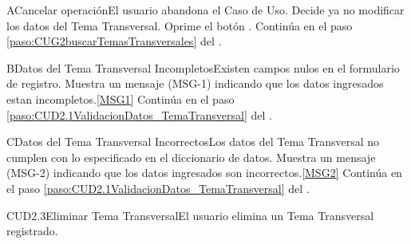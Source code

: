 		\begin{UCtrayectoriaA}{A}{Cancelar operación}{El usuario abandona el Caso de Uso.}
			\UCpaso[\UCactor] Decide ya no modificar los datos del Tema Transversal.
			\UCpaso[\UCactor] Oprime el botón .
			\UCpaso Continúa en el paso \ref{paso:CUG2buscarTemasTransversales} del .
		\end{UCtrayectoriaA}

	\begin{UCtrayectoriaA}{B}{Datos del Tema Transversal Incompletos}{Existen campos nulos en el formulario de registro.}
			\UCpaso Muestra un mensaje (MSG-1) indicando que los datos ingresados estan incompletos.\ref{MSG1}
			\UCpaso Continúa en el paso \ref{paso:CUD2.1ValidacionDatos_TemaTransversal} del .
	\end{UCtrayectoriaA}

	\begin{UCtrayectoriaA}{C}{Datos del Tema Transversal Incorrectos}{Los datos del Tema Transversal no cumplen con lo especificado en el diccionario de datos.}
			\UCpaso Muestra un mensaje (MSG-2) indicando que los datos ingresados son incorrectos.\ref{MSG2}
			\UCpaso Continúa en el paso \ref{paso:CUD2.1ValidacionDatos_TemaTransversal} del .
	\end{UCtrayectoriaA}

	\begin{UseCase}{CUD2.3}{Eliminar Tema Transversal}{El usuario elimina un Tema Transversal registrado.}
	\end{UseCase}


